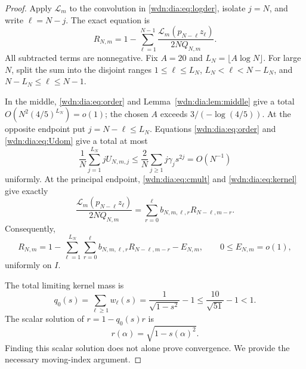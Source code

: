\documentclass[11pt,letterpaper]{article}
\theoremstyle{remark}\newtheorem{remark}[theorem]{Remark}
\newcommand{\LL}{\mathcal L}
\begin{document}
\begin{proof}
Apply $\LL_m$ to the convolution in \eqref{wdn:dia:eq:logder}, isolate $j=N$, and
write $\ell=N-j$. The exact equation is
\begin{equation}\label{wdn:dia:eq:Rexact}
 R_{N,m}=1-\sum_{\ell=1}^{N-1}
       \frac{\LL_m(p_{N-\ell}z_\ell)}{2NQ_{N,m}}.
\end{equation}
All subtracted terms are nonnegative. Fix $A=20$ and
$L_N=\lfloor A\log N\rfloor$. For large $N$, split the sum into the disjoint
ranges $1\le\ell\le L_N$, $L_N<\ell<N-L_N$, and
$N-L_N\le\ell\le N-1$.

In the middle, \eqref{wdn:dia:eq:order} and Lemma~\ref{wdn:dia:lem:middle} give a total
$O(N^2(4/5)^{L_N})=o(1)$; the chosen $A$ exceeds
$3/(-\log(4/5))$. At the opposite endpoint put $j=N-\ell\le L_N$.
Equations \eqref{wdn:dia:eq:order} and \eqref{wdn:dia:eq:Udom} give a total at most
\begin{equation}\label{wdn:dia:eq:opposite}
 \frac1N\sum_{j=1}^{L_N}jU_{N,m,j}
 \le\frac2N\sum_{j\ge1}j\gamma_js^{2j}=O(N^{-1})
\end{equation}
uniformly. At the principal endpoint, \eqref{wdn:dia:eq:cmult} and
\eqref{wdn:dia:eq:kernel} give exactly
\[
 \frac{\LL_m(p_{N-\ell}z_\ell)}{2NQ_{N,m}}
 =\sum_{r=0}^\ell b_{N,m,\ell,r}R_{N-\ell,m-r}.
\]
Consequently,
\begin{equation}\label{wdn:dia:eq:kernelrec}
 R_{N,m}=1-\sum_{\ell=1}^{L_N}\sum_{r=0}^\ell
 b_{N,m,\ell,r}R_{N-\ell,m-r}-E_{N,m},
 \qquad 0\le E_{N,m}=o(1),
\end{equation}
uniformly on $I$.

The total limiting kernel mass is
\begin{equation}\label{wdn:dia:eq:q0}
 q_0(s)=\sum_{\ell\ge1}w_\ell(s)
 =\frac1{\sqrt{1-s^2}}-1
 \le\frac{10}{\sqrt{51}}-1<1.
\end{equation}
The scalar solution of $r=1-q_0(s)r$ is
\begin{equation}\label{wdn:dia:eq:r0}
 r(\alpha)=\sqrt{1-s(\alpha)^2}.
\end{equation}
Finding this scalar solution does not alone prove convergence. We provide
the necessary moving-index argument.


\end{proof}
\end{document}
